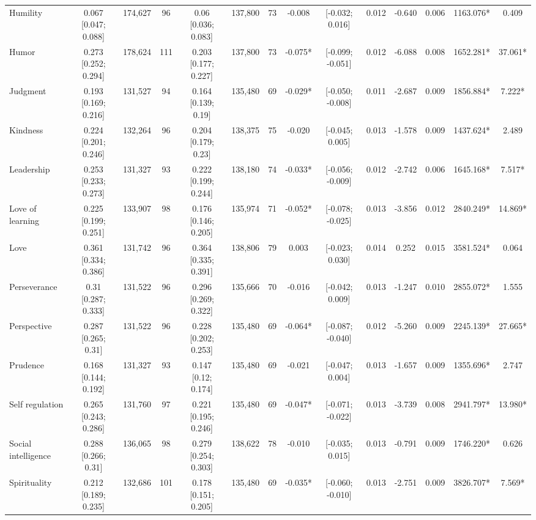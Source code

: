 \documentclass[
  man,floatsintext]{apa6}
\begin{document}
\begin{table}
{\begin{tabular}[t]{lccccccccccccc}
Humility & 0.067 [0.047; 0.088] & 174,627 & 96 & 0.06 [0.036; 0.083] & 137,800 & 73 & -0.008 & {}[-0.032;  0.016] & 0.012 & -0.640 & 0.006 & 1163.076* & 0.409\\
\addlinespace
Humor & 0.273 [0.252; 0.294] & 178,624 & 111 & 0.203 [0.177; 0.227] & 137,800 & 73 & -0.075* & {}[-0.099; -0.051] & 0.012 & -6.088 & 0.008 & 1652.281* & 37.061*\\
Judgment & 0.193 [0.169; 0.216] & 131,527 & 94 & 0.164 [0.139; 0.19] & 135,480 & 69 & -0.029* & {}[-0.050; -0.008] & 0.011 & -2.687 & 0.009 & 1856.884* & 7.222*\\
Kindness & 0.224 [0.201; 0.246] & 132,264 & 96 & 0.204 [0.179; 0.23] & 138,375 & 75 & -0.020 & {}[-0.045;  0.005] & 0.013 & -1.578 & 0.009 & 1437.624* & 2.489\\
Leadership & 0.253 [0.233; 0.273] & 131,327 & 93 & 0.222 [0.199; 0.244] & 138,180 & 74 & -0.033* & {}[-0.056; -0.009] & 0.012 & -2.742 & 0.006 & 1645.168* & 7.517*\\
Love of learning & 0.225 [0.199; 0.251] & 133,907 & 98 & 0.176 [0.146; 0.205] & 135,974 & 71 & -0.052* & {}[-0.078; -0.025] & 0.013 & -3.856 & 0.012 & 2840.249* & 14.869*\\
\addlinespace
Love & 0.361 [0.334; 0.386] & 131,742 & 96 & 0.364 [0.335; 0.391] & 138,806 & 79 & 0.003 & {}[-0.023;  0.030] & 0.014 & 0.252 & 0.015 & 3581.524* & 0.064\\
Perseverance & 0.31 [0.287; 0.333] & 131,522 & 96 & 0.296 [0.269; 0.322] & 135,666 & 70 & -0.016 & {}[-0.042;  0.009] & 0.013 & -1.247 & 0.010 & 2855.072* & 1.555\\
Perspective & 0.287 [0.265; 0.31] & 131,522 & 96 & 0.228 [0.202; 0.253] & 135,480 & 69 & -0.064* & {}[-0.087; -0.040] & 0.012 & -5.260 & 0.009 & 2245.139* & 27.665*\\
Prudence & 0.168 [0.144; 0.192] & 131,327 & 93 & 0.147 [0.12; 0.174] & 135,480 & 69 & -0.021 & {}[-0.047;  0.004] & 0.013 & -1.657 & 0.009 & 1355.696* & 2.747\\
Self regulation & 0.265 [0.243; 0.286] & 131,760 & 97 & 0.221 [0.195; 0.246] & 135,480 & 69 & -0.047* & {}[-0.071; -0.022] & 0.013 & -3.739 & 0.008 & 2941.797* & 13.980*\\
\addlinespace
Social intelligence & 0.288 [0.266; 0.31] & 136,065 & 98 & 0.279 [0.254; 0.303] & 138,622 & 78 & -0.010 & {}[-0.035;  0.015] & 0.013 & -0.791 & 0.009 & 1746.220* & 0.626\\
Spirituality & 0.212 [0.189; 0.235] & 132,686 & 101 & 0.178 [0.151; 0.205] & 135,480 & 69 & -0.035* & {}[-0.060; -0.010] & 0.013 & -2.751 & 0.009 & 3826.707* & 7.569*\\

\end{tabular}}
\end{table}
\end{document}

